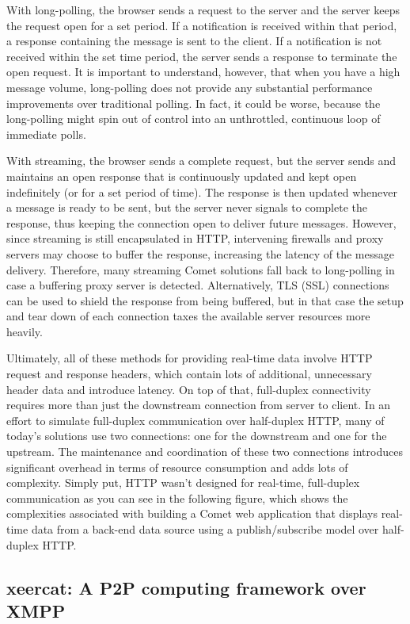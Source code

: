 \documentclass[12pt]{scrartcl}
\begin{document}
With long-polling, the browser sends a request to the server and the server keeps the request open for a set period. If a notification is received within that period, a response containing the message is sent to the client. If a notification is not received within the set time period, the server sends a response to terminate the open request. It is important to understand, however, that when you have a high message volume, long-polling does not provide any substantial performance improvements over traditional polling.  In fact, it could be worse, because the long-polling might spin out of control into an unthrottled, continuous loop of immediate polls.

With streaming, the browser sends a complete request, but the server sends and maintains an open response that is continuously updated and kept open indefinitely (or for a set period of time). The response is then updated whenever a message is ready to be sent, but the server never signals to complete the response, thus keeping the connection open to deliver future messages. However, since streaming is still encapsulated in HTTP, intervening firewalls and proxy servers may choose to buffer the response, increasing the latency of the message delivery. Therefore, many streaming Comet solutions fall back to long-polling in case a buffering proxy server is detected. Alternatively, TLS (SSL) connections can be used to shield the response from being buffered, but in that case the setup and tear down of each connection taxes the available server resources more heavily.

Ultimately, all of these methods for providing real-time data involve HTTP request and response headers, which contain lots of additional, unnecessary header data and introduce latency. On top of that, full-duplex connectivity requires more than just the downstream connection from server to client. In an effort to simulate full-duplex communication over half-duplex HTTP, many of today's solutions use two connections: one for the downstream and one for the upstream. The maintenance and coordination of these two connections introduces significant overhead in terms of resource consumption and adds lots of complexity. Simply put, HTTP wasn't designed for real-time, full-duplex communication as you can see in the following figure, which shows the complexities associated with building a Comet web application that displays real-time data from a back-end data source using a publish/subscribe model over half-duplex HTTP.

\subsection{xeercat: A P2P computing framework over XMPP}
\end{document}
